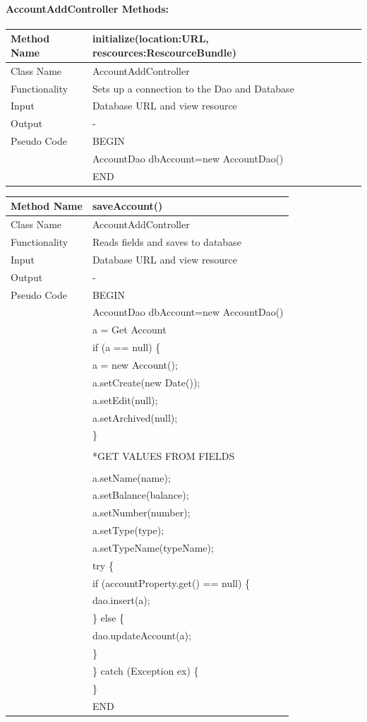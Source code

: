 \documentclass[12pt]{article}
\begin{document}
\paragraph{AccountAddController Methods:}

\begin{tabular}{ |p{3cm}||p{\colWidth}|  }
	\hline
	Method Name &  initialize(location:URL, rescources:RescourceBundle) \\
	\hline
	Class Name & AccountAddController\\
	\hline
	Functionality & Sets up a connection to the Dao and Database\\
	\hline
	Input & Database URL and view resource\\
	\hline
	Output & -\\
	\hline
	Pseudo Code & BEGIN\\
	& 		AccountDao dbAccount=new AccountDao() \\
	& END\\
	\hline
\end{tabular} 

\begin{tabular}{ |p{3cm}||p{\colWidth}|  }
	\hline
	Method Name &  saveAccount() \\
	\hline
	Class Name & AccountAddController\\
	\hline
	Functionality & Reads fields and saves to database\\
	\hline
	Input & Database URL and view resource\\
	\hline
	Output & -\\
	\hline
	Pseudo Code & BEGIN\\
	& 		AccountDao dbAccount=new AccountDao() \\
	&		 a  = Get Account\\
	&	if (a == null) \{\\
	&		a = new Account();\\
	&		a.setCreate(new Date());\\
	&		a.setEdit(null);\\
	&		a.setArchived(null);\\
	&	\}\\
	&\\
	&	*GET VALUES FROM FIELDS\\
	&	\\
	&	a.setName(name);\\
	&	a.setBalance(balance);\\
	&	a.setNumber(number);\\
	&	a.setType(type);\\
	&	a.setTypeName(typeName);\\
	&	try \{\\
	&		if (accountProperty.get() == null) \{\\
	&			dao.insert(a);\\
	&		\} else \{\\
	&			dao.updateAccount(a);\\
	&		\}\\
	&\} catch (Exception ex) \{\\
	&\}\\
	& END\\
	\hline
\end{tabular} 
\end{document}
